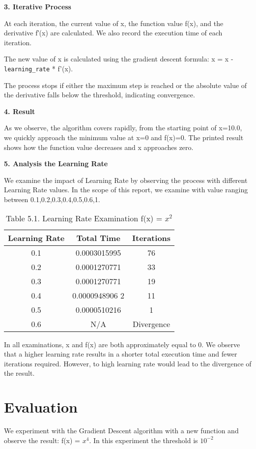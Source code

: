 \documentclass[12pt]{article}
\begin{document}
\textbf{3. Iterative Process}

At each iteration, the current value of x, the function value f(x), and the derivative f′(x) are calculated. We also record the execution time of each iteration.

The new value of x is calculated using the gradient descent formula: x = x - \texttt{learning\_rate} * f'(x). 

The process stops if either the maximum step is reached or the absolute value of the derivative falls below the threshold, indicating convergence.

\textbf{4. Result}

As we observe, the algorithm covers rapidly, from the starting point of x=10.0, we quickly approach the minimum value at x=0 and f(x)=0. The printed result shows how the function value decreases and x approaches zero.

\textbf{5. Analysis the Learning Rate}

We examine the impact of Learning Rate by observing the process with different Learning Rate values. In the scope of this report, we examine with value ranging between 0.1,0.2,0.3,0.4,0.5,0.6,1.

\begin{table}[htbp]
    \caption{Table 5.1. Learning Rate Examination f(x) = \( x^2 \)}
    \centering
    \begin{tabular}{|c|c|c|}
        \hline
        Learning Rate & Total Time & Iterations \\ 
        \hline
        0.1 & 0.0003015995 & 76 \\ 
        \hline
        0.2 & 0.0001270771 & 33 \\
        \hline 
        0.3 & 0.0001270771 & 19 \\
        \hline
        0.4 & 0.0000948906 2 & 11 \\
        \hline
        0.5 & 0.0000510216 & 1 \\
        \hline
        0.6 & N/A & Divergence \\
        \hline
    \end{tabular}
\end{table}

In all examinations, x and f(x) are both approximately equal to 0. We observe that a higher learning rate results in a shorter total execution time and fewer iterations required. However, to high learning rate would lead to the divergence of the result.

\section{Evaluation}
We experiment with the Gradient Descent algorithm with a new function and observe the result: f(x) = \(x^4\). In this experiment the threshold is \(10^{-2}\)
\end{document}

